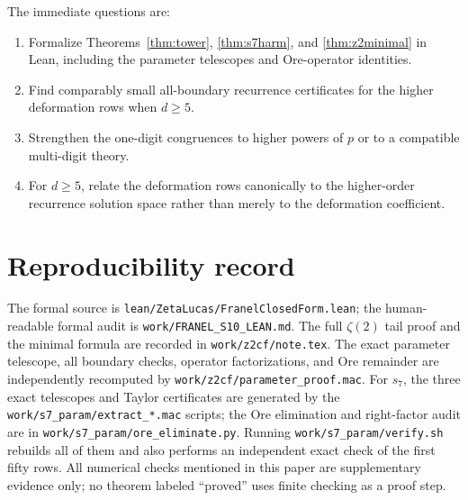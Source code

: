 \documentclass[11pt,reqno]{amsart}
\theoremstyle{definition}
\theoremstyle{remark}
\begin{document}
The immediate questions are:
\begin{enumerate}
\item Formalize Theorems~\ref{thm:tower}, \ref{thm:s7harm}, and
      \ref{thm:z2minimal} in Lean, including the parameter telescopes and
      Ore-operator identities.
\item Find comparably small all-boundary recurrence certificates for the
      higher deformation rows when $d\geq5$.
\item Strengthen the one-digit congruences to higher powers of $p$ or to a
      compatible multi-digit theory.
\item For $d\geq5$, relate the deformation rows canonically to the
      higher-order recurrence
      solution space rather than merely to the deformation coefficient.
\end{enumerate}

\section*{Reproducibility record}

The formal source is
\texttt{lean/ZetaLucas/FranelClosedForm.lean}; the human-readable formal audit
is \texttt{work/FRANEL\_S10\_LEAN.md}.  The full $\zeta(2)$ tail proof and the
minimal formula are recorded in \texttt{work/z2cf/note.tex}.  The exact
parameter telescope, all boundary checks, operator factorizations, and Ore
remainder are independently recomputed by
\nolinkurl{work/z2cf/parameter_proof.mac}.  For $s_7$, the three exact
telescopes and Taylor certificates are generated by the
\nolinkurl{work/s7_param/extract_*.mac} scripts; the Ore elimination and
right-factor audit are in \nolinkurl{work/s7_param/ore_eliminate.py}.  Running
\nolinkurl{work/s7_param/verify.sh} rebuilds all of them and also performs an
independent exact check of the first fifty rows.  All numerical checks mentioned in
this paper are supplementary evidence only; no theorem labeled ``proved'' uses
finite checking as a proof step.
\end{document}

